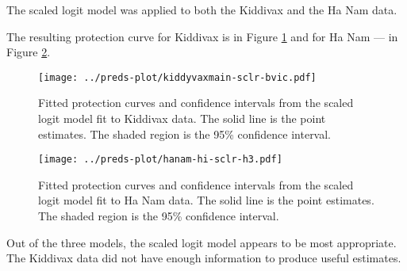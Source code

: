 The scaled logit model was applied to both the Kiddivax and the Ha Nam data.

The resulting protection curve for Kiddivax is in Figure \ref{fig:kiddyvaxmain-prot-sclr} and for Ha Nam --- in Figure \ref{fig:hanam-prot-sclr}.

\begin{figure}[htp]
    \centering
    \texttt{[image: ../preds-plot/kiddyvaxmain-sclr-bvic.pdf]}
    \caption{
        Fitted protection curves and confidence intervals from the scaled logit model fit to Kiddivax data. The solid line is the point estimates. The shaded region is the 95\% confidence interval.
    }
    \label{fig:kiddyvaxmain-prot-sclr}
\end{figure}

\begin{figure}[htp]
    \centering
    \texttt{[image: ../preds-plot/hanam-hi-sclr-h3.pdf]}
    \caption{
        Fitted protection curves and confidence intervals from the scaled logit model fit to Ha Nam data. The solid line is the point estimates. The shaded region is the 95\% confidence interval.
    }
    \label{fig:hanam-prot-sclr}
\end{figure}

Out of the three models, the scaled logit model appears to be most appropriate.
The Kiddivax data did not have enough information to produce useful estimates.
